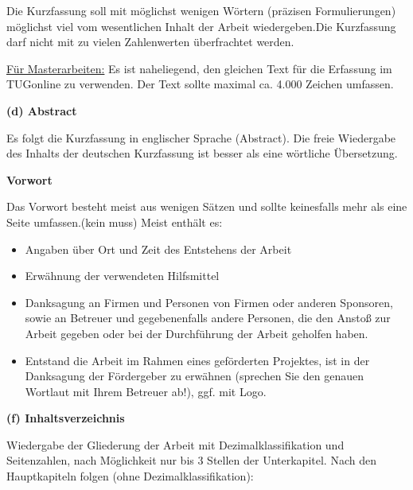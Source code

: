 Die Kurzfassung soll mit möglichst wenigen Wörtern (präzisen Formulierungen) möglichst viel vom wesentlichen Inhalt der Arbeit wiedergeben.Die Kurzfassung darf nicht mit zu vielen Zahlenwerten überfrachtet werden. 

\vspace{1mm}

\underline{Für Masterarbeiten:} Es ist naheliegend, den gleichen Text für die Erfassung im TUGonline zu verwenden. Der Text sollte maximal ca. 4.000 Zeichen umfassen.

\newpage

\textbf{(d) Abstract}

\vspace{1mm}

Es folgt die Kurzfassung in englischer Sprache (Abstract). Die freie Wiedergabe des Inhalts der deutschen Kurzfassung ist besser als eine wörtliche Übersetzung.

\vspace{1mm}

\textbf{Vorwort}

\vspace{1mm}

Das Vorwort besteht meist aus wenigen Sätzen und sollte keinesfalls mehr als eine Seite umfassen.(kein muss) Meist enthält es:

\begin{itemize}
    \item Angaben über Ort und Zeit des Entstehens der Arbeit
    \item Erwähnung der verwendeten Hilfsmittel
    \item Danksagung an Firmen und Personen von Firmen oder anderen Sponsoren, sowie an Betreuer und gegebenenfalls andere Personen, die den Anstoß zur Arbeit gegeben oder bei der Durchführung der Arbeit geholfen haben.
    \item Entstand die Arbeit im Rahmen eines geförderten Projektes, ist in der Danksagung der Fördergeber zu erwähnen (sprechen Sie den genauen Wortlaut mit Ihrem Betreuer ab!), ggf. mit Logo.
\end{itemize}

\vspace{1mm}

\textbf{(f) Inhaltsverzeichnis}

\vspace{1mm}

Wiedergabe der Gliederung der Arbeit mit Dezimalklassifikation und Seitenzahlen, nach Möglichkeit nur bis 3 Stellen der Unterkapitel. Nach den Hauptkapiteln folgen (ohne Dezimalklassifikation):

